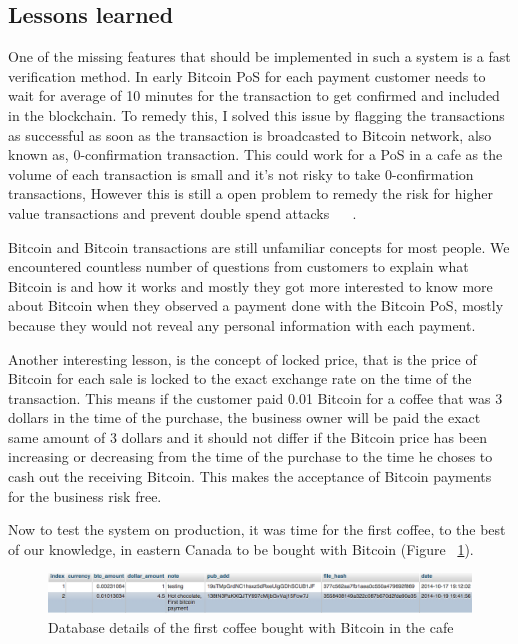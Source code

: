 \subsection{Lessons learned}
One of the missing features that should be implemented in such a system is a fast verification method. In early Bitcoin PoS for each payment customer needs to wait for average of 10 minutes for the transaction to get confirmed and included in the blockchain. To remedy this, I solved this issue by flagging the transactions as successful as soon as the transaction is broadcasted to Bitcoin network, also known as, 0-confirmation transaction. This could work for a PoS in a cafe as the volume of each transaction is small and it's not risky to take 0-confirmation transactions, However this is still a open problem to remedy the risk for higher value transactions and prevent double spend attacks ~\cite{karame2012two} ~\cite{bamert2013have}.

Bitcoin and Bitcoin transactions are still unfamiliar concepts for most people. We encountered countless number of questions from customers to explain what Bitcoin is and how it works and mostly they got more interested to know more about Bitcoin when they observed a payment done with the Bitcoin PoS, mostly because they would not reveal any personal information with each payment.

Another interesting lesson, is the concept of locked price, that is the price of Bitcoin for each sale is locked to the exact exchange rate on the time of the transaction. This means if the customer paid 0.01 Bitcoin for a coffee that was 3 dollars in the time of the purchase, the business owner will be paid the exact same amount of 3 dollars and it should not differ if the Bitcoin price has been increasing or decreasing from the time of the purchase to the time he choses to cash out the receiving Bitcoin. This makes the acceptance of Bitcoin payments for the business risk free.

Now to test the system on production, it was time for the first coffee, to the best of our knowledge, in eastern Canada to be bought with Bitcoin (Figure ~\ref{fig:firsttransaction}).

\begin{figure}[htb!p]
\centering
\includegraphics[width=\linewidth]{fig/first_cafe_transaction.png}
  \caption{Database details of the first coffee bought with Bitcoin in the cafe}
\label{fig:firsttransaction}
\end{figure}



